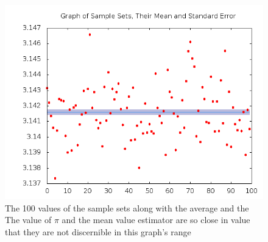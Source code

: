 \documentclass[twocolumn,prb,amsmath,amssymb,amsfonts]{revtex4}
\begin{document}
\begin{figure}
\includegraphics*[width=4.0 in]{pi_out.png}
\caption{The 100 values of the sample sets along with the average and the The value of $\pi$ and the mean value estimator are so close in value that they are not discernible in this graph's range}
\end{figure}
\end{document}

